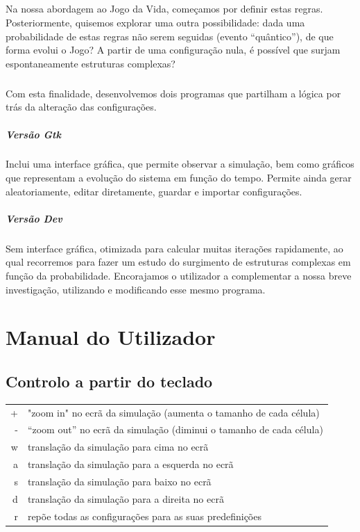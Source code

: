 \documentclass[a4paper,11pt]{book}
\begin{document}
\paragraph{}Na nossa abordagem ao Jogo da Vida, começamos por definir estas regras. Posteriormente, quisemos explorar uma outra possibilidade: dada uma probabilidade de estas regras não serem seguidas (evento “quântico”), de que forma evolui o Jogo? A partir de uma configuração nula, é possível que surjam espontaneamente estruturas complexas?
\paragraph{}Com esta finalidade, desenvolvemos dois programas que partilham a lógica por trás da alteração das configurações.
\paragraph{Versão Gtk}Inclui uma interface gráfica, que permite observar a simulação, bem como gráficos que representam a evolução do sistema em função do tempo. Permite ainda gerar aleatoriamente, editar diretamente, guardar e importar configurações. 
\paragraph{Versão Dev } Sem interface gráfica, otimizada para calcular muitas iterações rapidamente, ao qual recorremos para fazer um estudo do surgimento de estruturas complexas em função da probabilidade. Encorajamos o utilizador a complementar a nossa breve investigação, utilizando e modificando esse mesmo programa.
\chapter {Manual do Utilizador}
\section{Controlo a partir do teclado}

\begin{tabular}{|r|l|}
  \hline
  + & "zoom in" no ecrã da simulação (aumenta o tamanho de cada célula) \\
  - & “zoom out” no ecrã da simulação (diminui o tamanho de cada célula) \\
  w & translação da simulação para cima no ecrã \\
  a  & translação da simulação para a esquerda no ecrã\\
  s & translação da simulação para baixo no ecrã\\
  d &  translação da simulação para a direita no ecrã \\
  r & repõe todas as configurações para as suas predefinições \\
  \hline
\end{tabular}
\end{document}

